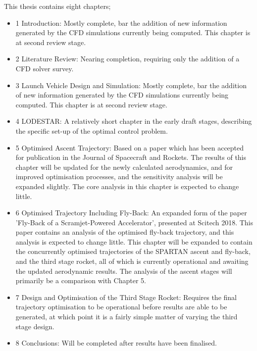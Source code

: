 This thesis contains eight chapters;
\begin{itemize}
\item 1 Introduction: Mostly complete, bar the addition of new information generated by the CFD simulations currently being computed. This chapter is at second review stage.
\item 2 Literature Review: Nearing completion, requiring only the addition of a CFD solver survey.
\item 3 Launch Vehicle Design and Simulation: Mostly complete, bar the addition of new information generated by the CFD simulations currently being computed. This chapter is at second review stage.
\item 4 LODESTAR: A relatively short chapter in the early draft stages, describing the specific set-up of the optimal control problem. 
\item 5 Optimised Ascent Trajectory: Based on a paper which has been accepted for publication in the Journal of Spacecraft and Rockets.
The results of this chapter will be updated for the newly calculated aerodynamics, and for improved optimisation processes, and the sensitivity analysis will be expanded slightly. The core analysis in this chapter is expected to change little.
\item 6 Optimised Trajectory Including Fly-Back: An expanded form of the paper 'Fly-Back of a Scramjet-Powered Accelerator', presented at Scitech 2018. This paper contains an analysis of the optimised fly-back trajectory, and this analysis is expected to change little. This chapter will be expanded to contain the concurrently optimised trajectories of the SPARTAN ascent and fly-back, and the third stage rocket, all of which is currently operational and awaiting the updated aerodynamic results. The analysis of the ascent stages will primarily be a comparison with Chapter 5. 
\item 7 Design and Optimisation of the Third Stage Rocket: Requires the final trajectory optimisation to be operational before results are able to be generated, at which point it is a fairly simple matter of varying the third stage design. 
\item 8 Conclusions: Will be completed after results have been finalised. 
\end{itemize} 

\newpage




